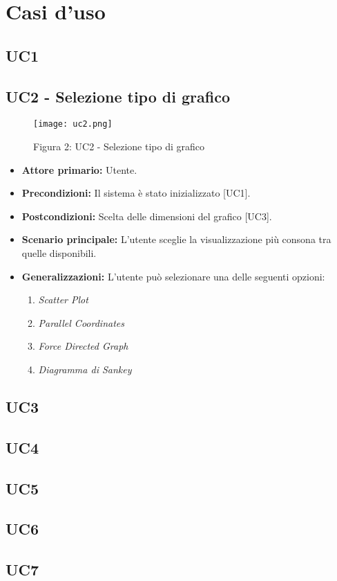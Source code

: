 \chapter{Casi d'uso}

\section{UC1}

\section{UC2 - Selezione tipo di grafico}
\begin{figure}[H]
 \texttt{[image: uc2.png]}
 \vspace{-5mm}
 \caption*{Figura 2: UC2 - Selezione tipo di grafico}
\end{figure}
 \begin{itemize}
     \item \textbf{Attore primario:} Utente.
     \item \textbf{Precondizioni:} Il sistema è stato inizializzato [UC1].
     \item \textbf{Postcondizioni:} Scelta delle dimensioni del grafico [UC3].
     \item \textbf{Scenario principale:} L'utente sceglie la visualizzazione più consona tra quelle disponibili.
     \item \textbf{Generalizzazioni:} L'utente può selezionare una delle seguenti opzioni:
     \begin{enumerate}
         \item \textit{Scatter Plot}
         \item \textit{Parallel Coordinates}
         \item \textit{Force Directed Graph}
         \item \textit{Diagramma di Sankey}
     \end{enumerate}
 \end{itemize}
 
\section{UC3}

\section{UC4}

\section{UC5}

\section{UC6}

\section{UC7}